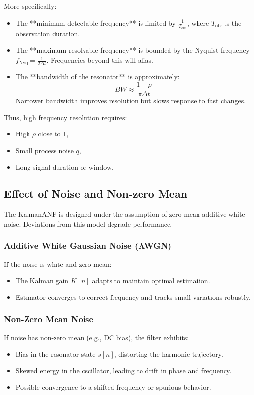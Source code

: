 \documentclass{article}
\begin{document}
More specifically:
\begin{itemize}
    \item The **minimum detectable frequency** is limited by \(\frac{1}{T_{\text{obs}}}\), where \(T_{\text{obs}}\) is the observation duration.
    \item The **maximum resolvable frequency** is bounded by the Nyquist frequency \(f_{\text{Nyq}} = \frac{1}{2\Delta t}\). Frequencies beyond this will alias.
    \item The **bandwidth of the resonator** is approximately:
    \[
    BW \approx \frac{1 - \rho}{\pi \Delta t}
    \]
    Narrower bandwidth improves resolution but slows response to fast changes.
\end{itemize}

Thus, high frequency resolution requires:
\begin{itemize}
    \item High \(\rho\) close to 1,
    \item Small process noise \(q\),
    \item Long signal duration or window.
\end{itemize}

\subsection{Effect of Noise and Non-zero Mean}

The KalmanANF is designed under the assumption of zero-mean additive white noise. Deviations from this model degrade performance.

\subsubsection*{Additive White Gaussian Noise (AWGN)}
If the noise is white and zero-mean:
\begin{itemize}
    \item The Kalman gain \(K[n]\) adapts to maintain optimal estimation.
    \item Estimator converges to correct frequency and tracks small variations robustly.
\end{itemize}

\subsubsection*{Non-Zero Mean Noise}
If noise has non-zero mean (e.g., DC bias), the filter exhibits:
\begin{itemize}
    \item Bias in the resonator state \(s[n]\), distorting the harmonic trajectory.
    \item Skewed energy in the oscillator, leading to drift in phase and frequency.
    \item Possible convergence to a shifted frequency or spurious behavior.
\end{itemize}
\end{document}
